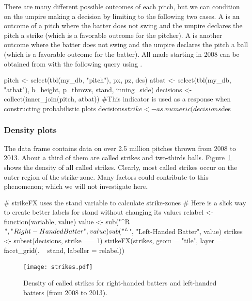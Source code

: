 \begin{article}
There are many different possible outcomes of each pitch, but we can
condition on the umpire making a decision by limiting to the following
two cases. A  is an outcome of a pitch where the
batter does not swing and the umpire declares the pitch a strike (which
is a favorable outcome for the pitcher). A  is another
outcome where the batter does not swing and the umpire declares the
pitch a ball (which is a favorable outcome for the batter). All 
made starting in 2008 can be obtained from  with the
following query using .
%
\begin{Schunk}
\begin{Sinput}
pitch <- select(tbl(my_db, "pitch"), px, pz, des)
atbat <- select(tbl(my_db, "atbat"), b_height, p_throws, stand, inning_side)
decisions <- collect(inner_join(pitch, atbat))
#This indicator is used as a response when constructing probabilistic plots
decisions$strike <- as.numeric(decisions$des %
\end{Sinput}
\end{Schunk}
%

\subsubsection{Density plots}

The  data frame contains data on over 2.5 million
pitches thrown from 2008 to 2013. About a third of them are called
strikes and two-thirds balls. Figure~\ref{fig:STRIKES} shows the
density of all called strikes. Clearly, most called strikes occur
on the outer region of the strike-zone. Many factors could contribute
to this phenomenon; which we will not investigate here.
%
\begin{Schunk}
\begin{Sinput}
# strikeFX uses the stand variable to calculate strike-zones 
# Here is a slick way to create better labels for stand without changing its values
relabel <- function(variable, value) { 
  value <- sub("^R$", "Right-Handed Batter", value) 
  sub("^L$", "Left-Handed Batter", value) 
}
strikes <- subset(decisions, strike == 1)
strikeFX(strikes, geom = "tile", layer = facet_grid(. ~ stand, labeller = relabel))
\end{Sinput}
\end{Schunk}
%
\begin{figure}[h]
\centerline{\texttt{[image: strikes.pdf]}}

\caption{\label{fig:STRIKES} Density of called strikes for right-handed batters
and left-handed batters (from 2008 to 2013).}
\end{figure}



\end{article}
